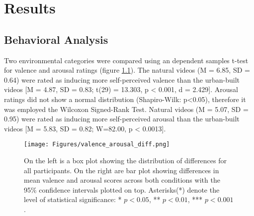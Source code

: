
\chapter{Results}
\label{chapter:results}


\section{Behavioral Analysis}
\label{section:behavioral_analysis}

Two environmental categories were compared using an dependent samples t-test for valence and arousal ratings (figure \ref{fig:val_aro_diff}). The natural videos (M = 6.85, SD = 0.64) were rated as inducing more self-perceived valence than the urban-built videos [M = 4.87, SD = 0.83; t(29) = 13.303, p < 0.001, d = 2.429]. Arousal ratings did not show a normal distribution (Shapiro-Wilk: p<0.05), therefore it was employed the Wilcoxon Signed-Rank Test. Natural videos (M = 5.07, SD = 0.95) were rated as inducing more self-perceived arousal than the urban-built videos [M = 5.83, SD = 0.82; W=82.00, p < 0.0013].

\begin{figure}[H]
	\centering
	\texttt{[image: Figures/valence\_arousal\_diff.png]}
	\caption{On the left is a box plot showing the distribution of differences for all participants. On the right are bar plot showing differences in mean valence and arousal scores across both conditions with the 95\% confidence intervals plotted on top. Asterisks(*) denote the level of statistical significance: * $p<0.05$, ** $p<0.01$, *** $p<0.001$. \label{fig:val_aro_diff}}
\end{figure}

